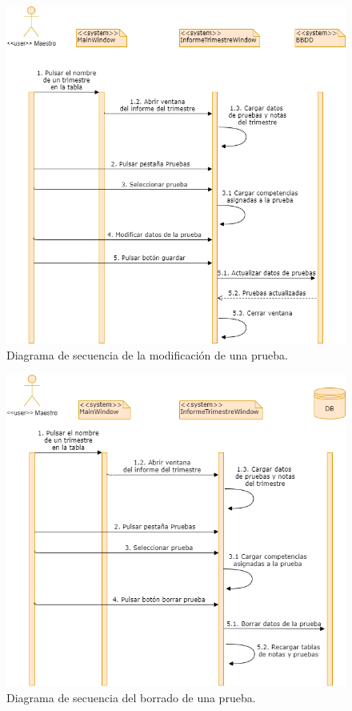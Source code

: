 \begin{figure}[H]
\centering\includegraphics[width=1\linewidth]{figs/dia_modificarprueba.png}
\caption{Diagrama de secuencia de la modificación de una prueba.}
\label{Fig:dia_modificarprueba}
\end{figure}

\begin{figure}[H]
\centering\includegraphics[width=0.75\linewidth]{figs/dia_borrarprueba.png}
\caption{Diagrama de secuencia del borrado de una prueba.}
\label{Fig:dia_borrarprueba}
\end{figure}

